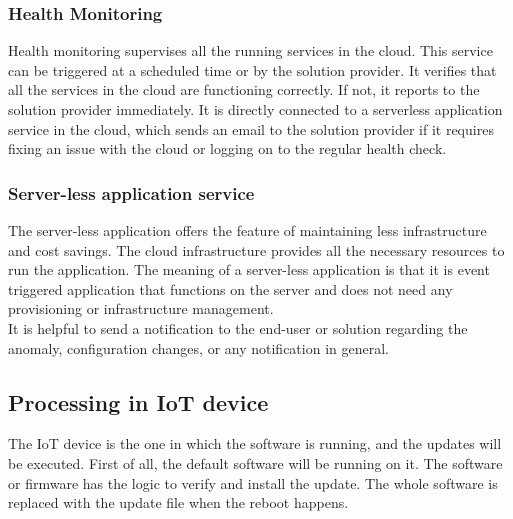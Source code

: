 \documentclass[12pt,a4paper]{article}
\begin{document}
{\subsubsection{Health Monitoring}

Health monitoring supervises all the running services in the cloud. This service can be triggered at a scheduled time or by the solution provider. It verifies that all the services in the cloud are functioning correctly. If not, it reports to the solution provider immediately. It is directly connected to a serverless application service in the cloud, which sends an email to the solution provider if it requires fixing an issue with the cloud or logging on to the regular health check.


\subsubsection{Server-less application service}

The server-less application offers the feature of maintaining less infrastructure and cost savings. The cloud infrastructure provides all the necessary resources to run the application. The meaning of a server-less application is that it is event triggered application that functions on the server and does not need any provisioning or infrastructure management. \cite{r35} \\

It is helpful to send a notification to the end-user or solution regarding the anomaly, configuration changes, or any notification in general.

\subsection{Processing in IoT device}

The IoT device is the one in which the software is running, and the updates will be executed. First of all, the default software will be running on it. The software or firmware has the logic to verify and install the update. The whole software is replaced with the update file when the reboot happens. \\

}
\end{document}
